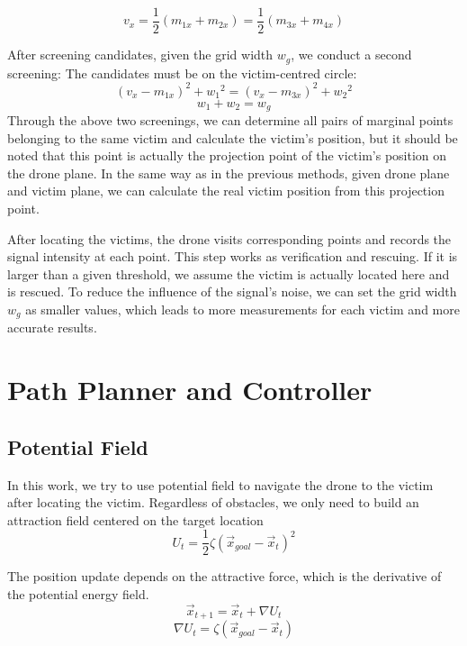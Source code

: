 \documentclass[conference]{IEEEtran}
\begin{document}
\begin{equation}
v_x = \frac{1}{2}(m_{1x} +m_{2x}) = \frac{1}{2}(m_{3x} +m_{4x})\label{eq:yd}
\end{equation}

After screening candidates, given the grid width $w_g$, we conduct a second screening: The candidates must be on the victim-centred circle:
\begin{equation}
(v_x - m_{1x})^2 + {w_1}^2 = (v_x - m_{3x})^2 + {w_2}^2\label{eq:yd}
\end{equation}
\begin{equation}
w_1 + w_2 = w_g\label{eq:yd}
\end{equation}
Through the above two screenings, we can determine all pairs of marginal points belonging to the same victim and calculate the victim's position, but it should be noted that this point is actually the projection point of the victim's position on the drone plane. In the same way as in the previous methods, given drone plane and victim plane, we can calculate the real victim position from this projection point.

After locating the victims, the drone visits corresponding points and records the signal intensity at each point. This step works as verification and rescuing. If it is larger than a given threshold, we assume the victim is actually located here and is rescued. To reduce the influence of the signal's noise, we can set the grid width $w_g$ as smaller values, which leads to more measurements for each victim and more accurate results.


\section{Path Planner and Controller}\label{section:path planner}

\subsection{Potential Field}

In this work, we try to use potential field to navigate the drone to the victim after locating the victim. Regardless of obstacles, we only need to build an attraction field centered on the target location
\begin{equation}
U_{t} = \frac{1}{2}\zeta(\Vec{x}_{goal} - \Vec{x}_{t})^2 \label{eq:pf}
\end{equation}

The position update depends on the attractive force, which is the derivative of the potential energy field.
\begin{equation}
\Vec{x}_{t+1} = \Vec{x}_{t} + \nabla U_{t} \label{eq:pf}
\end{equation}
\begin{equation}
\nabla U_{t} = \zeta(\Vec{x}_{goal} - \Vec{x}_{t}) \label{eq:pf}
\end{equation}
\end{document}
